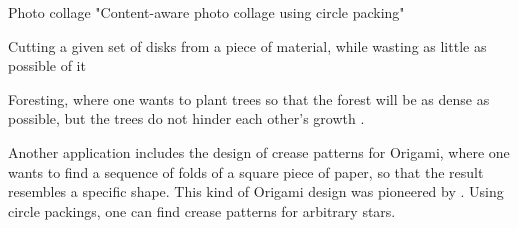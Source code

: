 Photo collage "Content-aware photo
collage using circle packing"

Cutting a given set of disks from a piece of material, while wasting as little as possible of it \cite{SMCSCG2007new}

Foresting, where one wants to plant trees so that the forest will be as dense as possible, but the trees do not hinder each other's growth \cite{SMCSCG2007new}.



Another application includes the design of crease patterns for Origami, where one wants to find a sequence of folds of a square piece of paper, so that the result resembles a specific shape. This kind of Origami design was pioneered by \cite{lang1996computational}. Using circle packings, one can find crease patterns for arbitrary stars.
